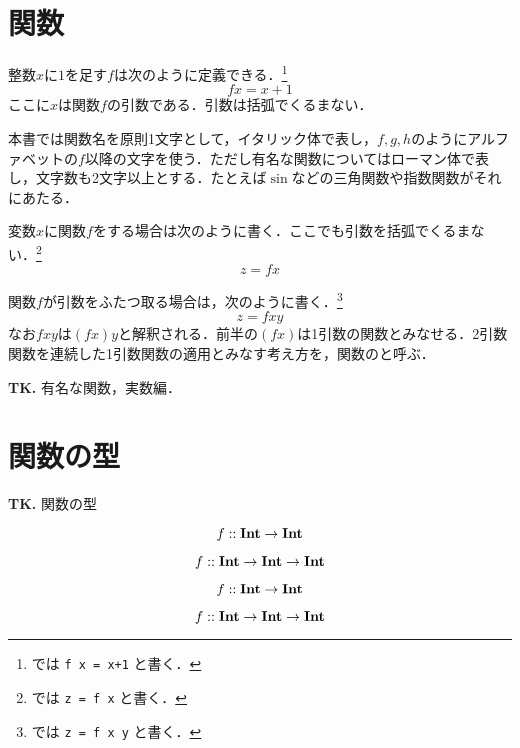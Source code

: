 \documentclass[platex,a5paper,twoside,fleqn,draft]{jsbook}
\newcommand{\keyword}[1]{\textgt{\textbf{#1}}}
\newcommand{\tobewritten}[1]{\begin{screen}\textbf{TK.} {#1}\end{screen}}
\begin{document}
\section{関数}

整数$x$に$1$を足す\keyword{関数}$f$は次のように定義できる．\footnote{\haskell では \verb|f x = x+1| と書く．}
\begin{equation}
fx=x+1
\end{equation}
ここに$x$は関数$f$の引数である．引数は括弧でくるまない．

本書では関数名を原則1文字として，イタリック体で表し，$f,g,h$のようにアルファベットの$f$以降の文字を使う．ただし有名な関数についてはローマン体で表し，文字数も2文字以上とする．たとえば$\sin$などの三角関数や指数関数がそれにあたる．

変数$x$に関数$f$を\keyword{適用}する場合は次のように書く．ここでも引数を括弧でくるまない．\footnote{\haskell では \verb|z = f x| と書く．}
\begin{equation}
z=fx
\end{equation}

関数$f$が引数をふたつ取る場合は，次のように書く．\footnote{\haskell では \verb|z = f x y| と書く．}
\begin{equation}
z=fxy
\end{equation}
なお$fxy$は$(fx)y$と解釈される．前半の$(fx)$は1引数の関数とみなせる．2引数関数を連続した1引数関数の適用とみなす考え方を，関数の\keyword{カリー化}と呼ぶ．

\tobewritten{有名な関数，実数編．}

\section{関数の型}

\tobewritten{関数の型}

\begin{equation}
f::\mathord{\mathbf{Int}}\rightarrow\mathord{\mathbf{Int}}
\end{equation}

\begin{equation}
f::\mathord{\mathbf{Int}}\rightarrow\mathord{\mathbf{Int}}\rightarrow\mathord{\mathbf{Int}}
\end{equation}

\begin{equation}
  f::\mathord{\mathbf{Int}}\rightarrow\mathord{\mathbf{Int}}
\end{equation}

\begin{equation}
  f::\mathord{\mathbf{Int}}\rightarrow\mathord{\mathbf{Int}}\rightarrow\mathord{\mathbf{Int}}
\end{equation}
\end{document}

